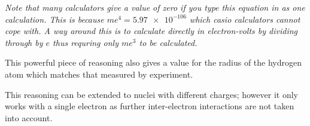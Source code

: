 \documentclass[main.tex]{subfiles}
\begin{document}
\emph{Note that many calculators give a value of zero if you type this equation in as one calculation. This is because $me^4 = \num{5.97e-106}$ which casio calculators cannot cope with. A way around this is to calculate directly in electron-volts by dividing through by $e$ thus requring only $me^3$ to be calculated.}

This powerful piece of reasoning also gives a value for the radius of the hydrogen atom which matches that measured by experiment.

This reasoning can be extended to nuclei with different charges; however it only works with a single electron as further inter-electron interactions are not taken into account.
\end{document}

